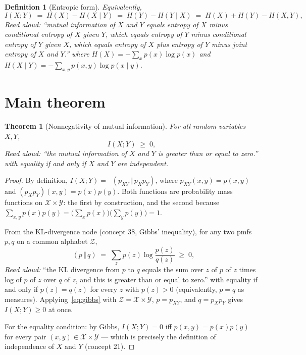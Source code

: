 \documentclass[11pt]{article}
\newtheorem{theorem}{Theorem}
\newtheorem{definition}{Definition}
\DeclareMathOperator{\KL}{D_{\mathrm{KL}}}
\begin{document}
\begin{definition}[Entropic form]
Equivalently,
\[
  I(X; Y) \;=\; H(X) - H(X \mid Y) \;=\; H(Y) - H(Y \mid X) \;=\; H(X) + H(Y) - H(X, Y),
\]
\emph{Read aloud:} ``mutual information of $X$ and $Y$ equals entropy of $X$
minus conditional entropy of $X$ given $Y$, which equals entropy of $Y$ minus
conditional entropy of $Y$ given $X$, which equals entropy of $X$ plus entropy
of $Y$ minus joint entropy of $X$ and $Y$.''
where $H(X) = -\sum_x p(x) \log p(x)$ and
$H(X \mid Y) = -\sum_{x, y} p(x, y) \log p(x \mid y)$.
\end{definition}

\section{Main theorem}

\begin{theorem}[Nonnegativity of mutual information]
\label{thm:mi-nonneg}
For all random variables $X, Y$,
\[
  I(X; Y) \;\ge\; 0,
\]
\emph{Read aloud:} ``the mutual information of $X$ and $Y$ is greater than or
equal to zero.''
with equality if and only if $X$ and $Y$ are independent.
\end{theorem}

\begin{proof}
By definition, $I(X; Y) = \KL(p_{XY} \,\Vert\, p_X p_Y)$, where $p_{XY}(x, y) = p(x, y)$
and $(p_X p_Y)(x, y) = p(x) p(y)$. Both functions are probability mass
functions on $\mathcal{X} \times \mathcal{Y}$: the first by construction, and
the second because
$\sum_{x, y} p(x) p(y) = \bigl(\sum_x p(x)\bigr)\bigl(\sum_y p(y)\bigr) = 1$.

From the KL-divergence node (concept 38, Gibbs' inequality), for any two pmfs
$p, q$ on a common alphabet $\mathcal{Z}$,
\begin{equation}
  \KL(p \,\Vert\, q) \;=\; \sum_z p(z) \log \frac{p(z)}{q(z)} \;\ge\; 0, \label{eq:gibbs}
\end{equation}
\emph{Read aloud:} ``the KL divergence from $p$ to $q$ equals the sum over $z$
of $p$ of $z$ times log of $p$ of $z$ over $q$ of $z$, and this is greater than
or equal to zero.''
with equality if and only if $p(z) = q(z)$ for every $z$ with $p(z) > 0$ (equivalently,
$p = q$ as measures). Applying~\eqref{eq:gibbs} with $\mathcal{Z} = \mathcal{X} \times \mathcal{Y}$,
$p = p_{XY}$, and $q = p_X p_Y$ gives $I(X; Y) \ge 0$ at once.

For the equality condition: by Gibbs, $I(X; Y) = 0$ iff $p(x, y) = p(x) p(y)$ for
every pair $(x, y) \in \mathcal{X} \times \mathcal{Y}$ — which is precisely
the definition of independence of $X$ and $Y$ (concept 21).
\end{proof}
\end{document}
